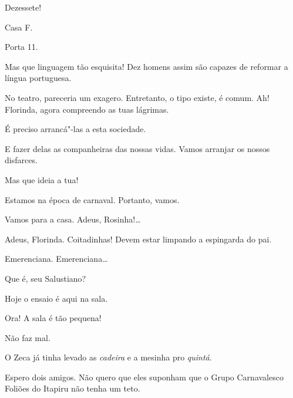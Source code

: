  Dezessete!

 Casa F.

 Porta 11. 




Mas que linguagem tão esquisita! Dez homens
assim são capazes de reformar a língua portuguesa.

 No teatro,
pareceria um exagero. Entretanto, o tipo existe, é comum.
Ah! Florinda, agora compreendo as tuas lágrimas.

  É
preciso arrancá"-las a esta sociedade.

 E fazer delas as
companheiras das nossas vidas. Vamos arranjar os nossos disfarces.

Mas que ideia a tua!

 Estamos na
época de carnaval. Portanto, vamos.

 Vamos para
a casa. Adeus, Rosinha!\ldots{}

 Adeus, Florinda. Coitadinhas! Devem
estar limpando a espingarda do pai. 








 Emerenciana.
Emerenciana\ldots{}

  
Que é, seu Salustiano?

  
Hoje o ensaio é aqui na sala.

 Ora! A sala é tão pequena!

 Não faz mal.

 O Zeca
já tinha levado as \textit{cadeira}
e a mesinha pro \textit{quintá}.

 Espero dois amigos. Não
quero que eles suponham que o Grupo Carnavalesco
Foliões do Itapiru não
tenha um teto.

